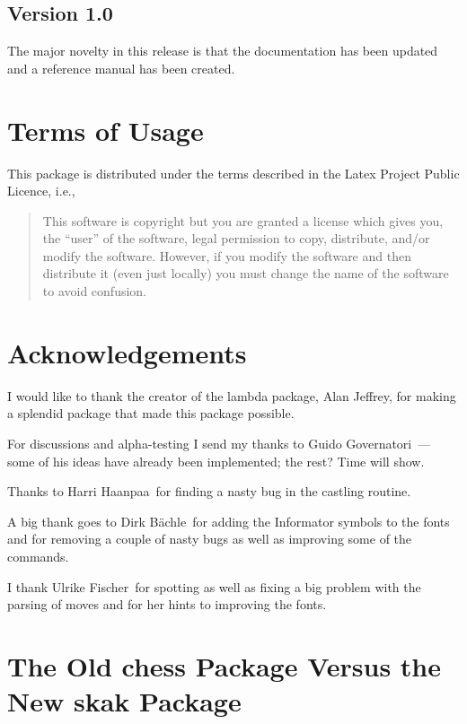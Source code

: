 \documentclass[11pt,twocolumn]{article}
\newcommand{\package}[1]{\textsf{#1}}
\newcommand{\Guido}{Guido Governatori\ }
\newcommand{\Harri}{Harri Haanpaa\ }
\newcommand{\Dirk}{Dirk B\"achle\ }
\newcommand{\Ulrike}{Ulrike Fischer\ }
\begin{document}
\subsection*{Version 1.0}
\label{sec:version-1.0}

The major novelty in this release is that the documentation has been
updated and a reference manual has been created.


\section{Terms of Usage}
\label{sec:terms-usage}

This package is distributed under the terms described in the Latex
Project Public Licence, i.e.,    

\begin{quote}
  This software is copyright but you are granted a license which gives
  you, the ``user'' of the software, legal permission to copy,
  distribute, and/or modify the software. However, if you modify the
  software and then distribute it (even just locally) you must change
  the name of the software to avoid confusion.
\end{quote}

\section{Acknowledgements}
\label{sec:acknowledgements}

I would like to thank the creator of the \package{lambda} package,
Alan Jeffrey, for making a splendid package that made this package
possible.

For discussions and alpha-testing I send my thanks to \Guido --- some
of his ideas have already been implemented; the rest? Time will show.

Thanks to \Harri for finding a nasty bug in the castling routine.

A big thank goes to \Dirk for adding the Informator symbols to the
fonts and for removing a couple of nasty bugs as well as improving
some of the commands.

I thank \Ulrike for spotting as well as fixing a big problem with the
parsing of moves and for her hints to improving the fonts.

\section{The Old \package{chess} Package Versus the New \package{skak}
  Package}
\label{sec:old-vs-new}
\end{document}
